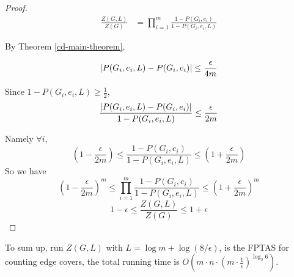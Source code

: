 \begin{proof}

	\begin{align*}
		\frac{Z(G, L)}{Z(G)} &= \prod_{i=1}^m \frac{1-P(G_i, e_i)}{1-P(G_i, e_i, L)}
	\end{align*}

	By Theorem \ref{cd-main-theorem},

	\[\left\vert P(G_i, e_i, L) - P(G_i,e_i)\right\vert \leq \frac{\epsilon}{4m}\]

	Since $1-P(G_i,e_i, L) \geq \frac{1}{2}$,
	\[ \frac{\left\vert P(G_i, e_i, L) - P(G_i,e_i)\right\vert}{1 - P(G_i,e_i, L)} \leq \frac{\epsilon}{2m}\]
	
	Namely $\forall i$,
	\[ \left( 1 - \frac{\epsilon}{2m} \right) \leq \frac{1-P(G_i, e_i)}{1 - P(G_i,e_i, L)} \leq \left( 1 + \frac{\epsilon}{2m} \right)\]
	So we have
	\[ \left( 1 - \frac{\epsilon}{2m} \right)^m \leq \prod_{i=1}^m \frac{1-P(G_i, e_i)}{1 - P(G_i,e_i, L)} \leq \left( 1 + \frac{\epsilon}{2m} \right)^m\]
	\[ 1- \epsilon \leq \frac{Z(G, L)}{Z(G)} \leq 1+ \epsilon\]


\end{proof}

To sum up, run $Z(G, L)$ with $L = \log m + \log(8/ \epsilon)$, is the FPTAS for counting edge covers,
the total running time is $O(m \cdot n \cdot ( m\cdot \frac{1}{\epsilon})^ {\log_2 6} )$.
